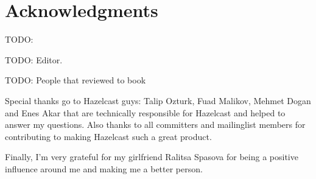 \chapter*{Acknowledgments}

TODO: 

TODO: Editor.

TODO: People that reviewed to book

Special thanks go to Hazelcast guys: Talip Ozturk, Fuad Malikov, Mehmet Dogan and Enes Akar that are technically responsible for Hazelcast and helped to answer my questions. Also thanks to all committers and mailinglist members for contributing to making Hazelcast such a great product.

Finally, I'm very grateful for my girlfriend Ralitsa Spasova for being a positive influence around me and making me a better person.

